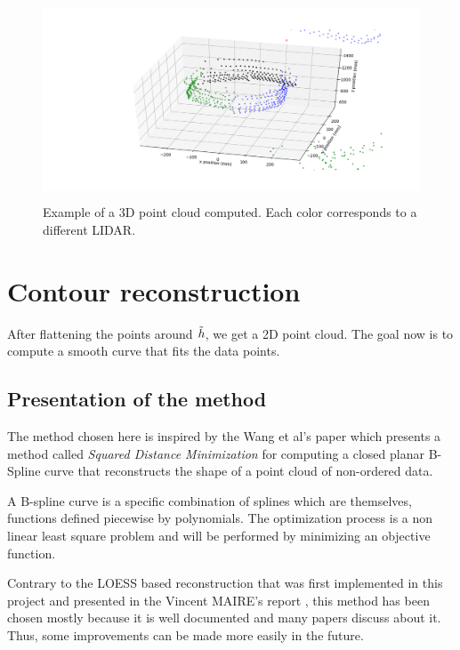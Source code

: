 \documentclass{article}
\newcommand{\vsp}{\vspace{\baselineskip}}
\begin{document}
\begin{figure}[H]
    \centering
    \includegraphics[height = 6cm]{images/3D_cloud.png}
    \caption[Example of 3D a point cloud]{Example of a 3D point cloud computed. Each color corresponds to a different LIDAR.}
    \label{fig:3D_cloud}
\end{figure}



\section{Contour reconstruction}

After flattening the points around $\Tilde{h}$, we get a 2D point cloud. The goal now is to compute a smooth curve that fits the data points.



\subsection{Presentation of the method}

The method chosen here is inspired by the Wang et al's paper \cite{SDM_bspline_fitting} which presents a method called \textit{Squared Distance Minimization} for computing a closed planar B-Spline curve that reconstructs the shape of a point cloud of non-ordered data. 

\vsp

A B-spline curve is a specific combination of splines which are themselves, functions defined piecewise by polynomials. The optimization process is a non linear least square problem and will be performed by minimizing an objective function. 

\vsp

Contrary to the LOESS based reconstruction that was first implemented in this project and presented in the Vincent MAIRE's report \cite{MAIRE_internship_report}, this method has been chosen mostly because it is well documented and many papers discuss about it. Thus, some improvements can be made more easily in the future.
\end{document}

